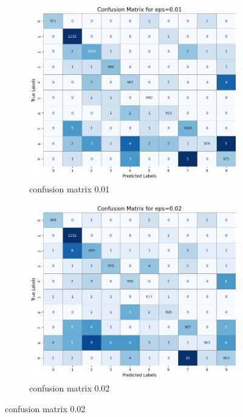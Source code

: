 \documentclass[11pt,onside]{article}
\begin{document}
\begin{figure}[h]
  \centering
  \begin{subfigure}[b]{0.49\textwidth}
    \centering
    \includegraphics[width=\textwidth]{V2_images/target_confusion_matrix_eps_0.01_attack_1.png}
    \caption{confusion matrix 0.01}
    \label{fig:image1}
  \end{subfigure}
  \hfill
  \begin{subfigure}[b]{0.49\textwidth}
    \centering
    \includegraphics[width=\textwidth]{V2_images/target_confusion_matrix_eps_0.02_attack_1.png}
    \caption{confusion matrix 0.02}
    \label{fig:image2}
  \end{subfigure}
  
  \label{fig:images}
\end{figure}
\end{document}
